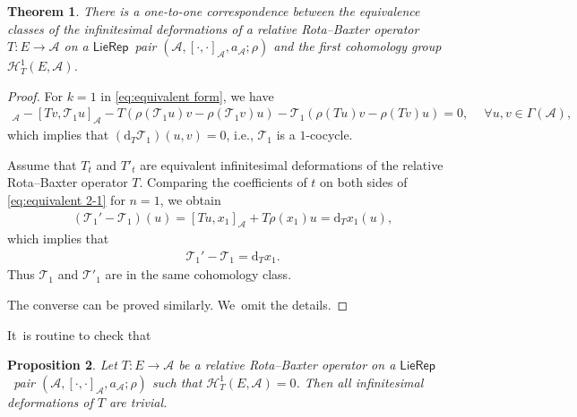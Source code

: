 \documentclass[pdftex]{sigma}%
\numberwithin{equation}{section}
\newtheorem{thm}{Theorem}[section]
\newtheorem{pro}[thm]{Proposition}
\newcommand{\huaA}{\mathcal{A}}
\newcommand{\huaT}{\mathcal{T}}
\newcommand{\huaH}{\mathcal{H}}
\newcommand{\dM}{\mathrm{d}}
\newcommand{\LP}{$\mathsf{LieRep}$~}
\begin{document}
\begin{thm}\label{pro:equivalence class of O}
 There is a one-to-one correspondence between the equivalence classes of the infinitesimal deformations of a relative Rota--Baxter operator $T\colon E\longrightarrow \huaA$ on a \LP pair $(\huaA,[\cdot,\cdot]_\huaA,a_\huaA;\rho)$ and the first cohomology group $\huaH_{T}^1(E,\huaA)$.
\end{thm}
\begin{proof}
 For $k=1$ in \eqref{eq:equivalent form}, we have
 \begin{gather*}
 [Tu,\huaT_1 v]_\huaA\!-\![Tv,\huaT_1 u]_\huaA\!-\!T(\rho(\huaT_1 u)v\!-\!\rho(\huaT_1 v)u)\!-\!\huaT_1(\rho(T u)v\!-\!\rho(T v)u)\!=0,\quad\ \forall u,v\in\Gamma(\huaA),
 \end{gather*}
 which implies that $(\dM_T \huaT_1)(u,v)=0$, i.e., $\huaT_1$ is a $1$-cocycle.

 Assume that $T_t$ and $T'_t$ are equivalent infinitesimal deformations of the relative Rota--Baxter operator $T$. Comparing the coefficients of $t$ on both sides of \eqref{eq:equivalent 2-1} for $n=1$, we obtain
 \begin{eqnarray*}%
(\huaT_1'-\huaT_1)(u)=[Tu,x_1]_\huaA+T\rho(x_1)u=\dM_T x_1(u),
\end{eqnarray*}
which implies that
\begin{gather*}%
\huaT_1'-\huaT_1=\dM_T x_1.	
\end{gather*}
Thus $\huaT_1$ and $\huaT'_1$ are in the same cohomology class.

The converse can be proved similarly. We~omit the details.
\end{proof}


It~is routine to check that
{\sloppy\begin{pro}\label{pro:trivial of O-operator}
Let $T\colon E\longrightarrow \huaA$ be a relative Rota--Baxter operator on a \LP pair $(\huaA,[\cdot,\cdot]_\huaA,a_\huaA;\rho)$ such that $\huaH_{T}^1(E,\huaA)=0$. Then all infinitesimal deformations of $T$ are tri\-vial.
\end{pro}}
\end{document}
